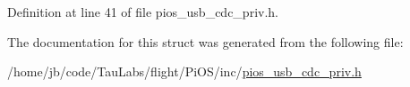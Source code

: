 \-Definition at line 41 of file pios\-\_\-usb\-\_\-cdc\-\_\-priv.\-h.



\-The documentation for this struct was generated from the following file\-:\begin{DoxyCompactItemize}
\item 
/home/jb/code/\-Tau\-Labs/flight/\-Pi\-O\-S/inc/\hyperlink{pios__usb__cdc__priv_8h}{pios\-\_\-usb\-\_\-cdc\-\_\-priv.\-h}\end{DoxyCompactItemize}
